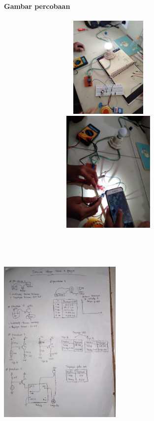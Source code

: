\documentclass[12pt,a4paper]{article}
\begin{document}
\newpage
\begin{figure}
\paragraph{Gambar percobaan}
\paragraph{ }
\begin{center}

\includegraphics[width=12cm, height=5cm]{per5a.png}

\includegraphics[width=12cm, height=6cm]{per5b.png}

\includegraphics[width=6cm, height=12cm]{dat.png}
\end{center}
\end{figure}
\vspace{2cm}
\end{document}
